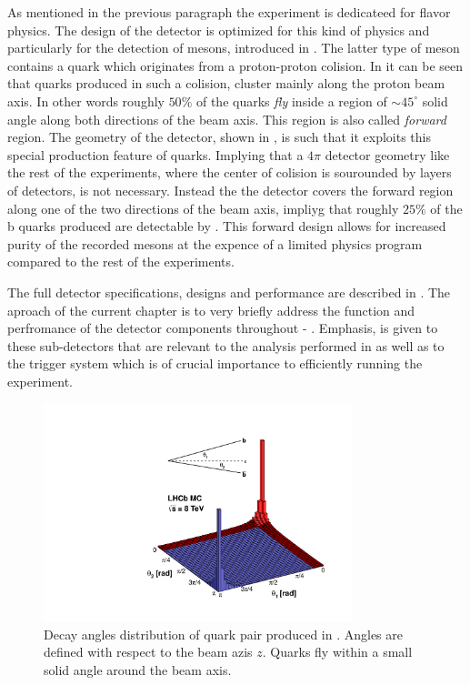 As mentioned in the previous paragraph the \lhcb experiment is dedicateed for flavor physics.
The design of the detector is optimized for this kind of physics and particularly for the detection
of \B mesons, introduced in . The latter type of meson contains a \bquark quark
which originates from a proton-proton colision. In  it can be seen
that \bquark quarks produced in such a colision, cluster mainly along the proton beam axis. In other words
roughly $50\%$ of the \bquark quarks {\it fly} inside a region of $\sim 45^\circ$ solid angle along both
directions of the beam axis. This region is also called {\it forward} region. The geometry of the \lhcb detector,
shown in , is such that it exploits this special production feature of \bquark quarks. Implying that
a $4\pi$ detector geometry like the rest of the \lhc experiments, where the center of colision is sourounded
by layers of detectors, is not necessary. Instead the the \lhcb detector covers the forward region along one
of the two directions of the beam axis, impliyg that roughly $25\%$ of the b quarks produced are detectable
by \lhcb. This forward design allows for increased purity of the recorded \B mesons at the expence of a limited
physics program compared to the rest of the \lhcb experiments.

The full \lhcb detector specifications, designs and performance are described in \cite{Aaij:2014jba}.
The aproach of the current chapter is to very briefly address the function and perfromance of the detector components
throughout  - . Emphasis, is given to these sub-detectors that are relevant
to the analysis performed in  as well as to the trigger system which is of crucial importance
to efficiently running the \lhcb experiment.

\begin{figure}[t]
  \centering
  \includegraphics[width=0.8\textwidth, trim=0cm 0cm 0cm 2.5cm, clip=true]{Figures/Chapter2/08_rad_acc_scheme_right}
  \caption{Decay angles distribution of \bquark quark pair produced in \lhcb. Angles are defined with
           respect to the beam azis $z$. Quarks fly within a small solid angle around the beam axis.}
  \label{bb_roduction_angles}
\end{figure}
